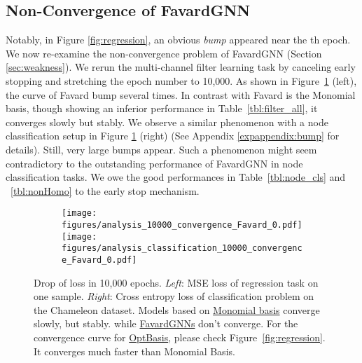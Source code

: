 %
 
\subsection{Non-Convergence of FavardGNN}
\label{sec:exp_compare}



Notably, in Figure \ref{fig:regression},  
an obvious \textit{bump} appeared near the th epoch. We now re-examine the non-convergence problem of FavardGNN (Section \ref{sec:weakness}). 
We rerun the multi-channel filter learning task by canceling early stopping and stretching the epoch number to 10,000. As shown in Figure~\ref{fig:regression_10000} (left), the curve of Favard bump several times. In contrast with Favard is the Monomial basis, though showing an inferior performance in Table~\ref{tbl:filter_all}, it converges slowly but stably. 
We observe a similar phenomenon with a node classification setup in Figure \ref{fig:regression_10000} (right) (See Appendix \ref{expappendix:bump} for details).
Still, very large bumps appear. Such a phenomenon might seem contradictory to the outstanding performance of FavardGNN in node classification tasks. We owe the good performances in Table~\ref{tbl:node_cls} and ~\ref{tbl:nonHomo} to the early stop mechanism. 

\begin{figure}[htp]
\begin{subfigure}{.5\textwidth}
    \centering
    \texttt{[image: figures/analysis\_10000\_convergence\_Favard\_0.pdf]}  
    \texttt{[image: figures/analysis\_classification\_10000\_convergence\_Favard\_0.pdf]}  
  \end{subfigure}
  \caption{Drop of loss in 10,000 epochs. \textit{Left}: MSE loss of regression task on one sample. 
  \textit{Right}: Cross entropy loss of classification problem on the Chameleon dataset. 
  Models based on \underline{Monomial basis} converge slowly, but stably. 
  while \underline{FavardGNNs} don't converge. 
  For the convergence curve for \underline{OptBasis}, please check Figure~\ref{fig:regression}. It converges much faster than Monomial Basis. 
  }
  \label{fig:regression_10000}
  \end{figure}




%
 




































